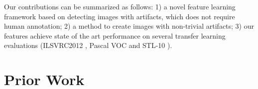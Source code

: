 \documentclass[10pt,twocolumn,letterpaper]{article}
\begin{document}
Our contributions can be summarized as follows: 1) a novel feature learning framework based on detecting images with artifacts, which does not require human annotation; 2) a method to create images with non-trivial artifacts; 3) our features achieve state of the art performance on several transfer learning evaluations (ILSVRC2012 \cite{imagenet_cvpr09}, Pascal VOC \cite{everingham2010pascal} and STL-10 \cite{coates2011analysis}).







%
%
%
%
%
%
%
%
%
%

\section{Prior Work}
\end{document}
